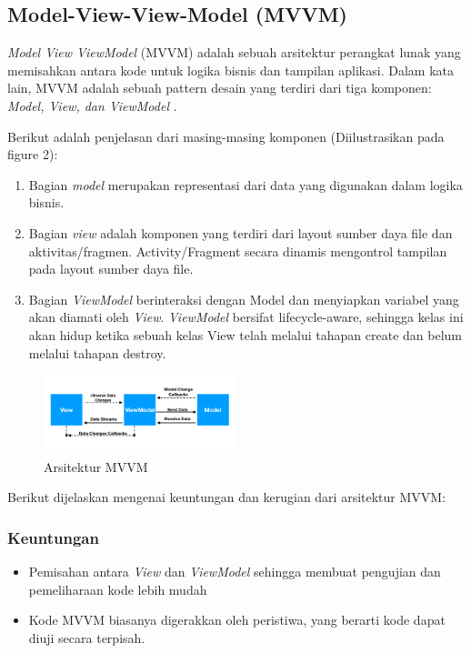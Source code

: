 \documentclass[conference]{IEEEtran}
\begin{document}
	\subsection{Model-View-View-Model (MVVM)}
	\textit{Model View ViewModel} (MVVM) adalah sebuah arsitektur perangkat lunak yang memisahkan antara kode untuk logika bisnis dan tampilan aplikasi\cite{MVVM}. Dalam kata lain, MVVM adalah sebuah pattern desain yang terdiri dari tiga komponen: \textit{Model, View, dan ViewModel} \cite{MVVM2}.  
	
	Berikut adalah penjelasan dari masing-masing komponen (Diilustrasikan pada figure 2):
	\begin{enumerate}[label=\alph*]
		\item Bagian \textit{model} merupakan representasi dari data yang digunakan dalam logika bisnis.
		\item Bagian \textit{view} adalah komponen yang terdiri dari layout sumber daya file dan aktivitas/fragmen. Activity/Fragment secara dinamis mengontrol tampilan pada layout sumber daya file.
		\item Bagian \textit{ViewModel} berinteraksi dengan Model dan menyiapkan variabel yang akan diamati oleh \textit{View}. \textit{ViewModel} bersifat lifecycle-aware, sehingga kelas ini akan hidup ketika sebuah kelas View telah melalui tahapan create dan belum melalui tahapan destroy.
	\end{enumerate}
	
	
	\begin{figure}
		\includegraphics[width=0.5\textwidth]{images/MVVM}
		\caption{Arsitektur MVVM}
	\end{figure}

	Berikut dijelaskan mengenai keuntungan dan kerugian dari arsitektur MVVM:
	\subsubsection{Keuntungan}
	\begin{itemize}
		\item Pemisahan antara \textit{View} dan \textit{ViewModel} sehingga membuat pengujian dan pemeliharaan kode lebih mudah
		\item Kode MVVM biasanya digerakkan oleh peristiwa, yang berarti kode dapat diuji secara terpisah.
	\end{itemize}
\end{document}
